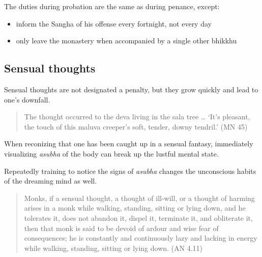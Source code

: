 The duties during probation are the same as during penance, except:

\begin{itemize}
\tightlist
\item
  inform the Sangha of his offense every fortnight, not every day
\item
  only leave the monastery when accompanied by a single other bhikkhu
\end{itemize}

\subsection{Sensual thoughts}

Sensual thoughts are not designated a penalty, but they grow quickly and
lead to one's downfall.

\begin{quote}
The thought occurred to the deva living in the sala tree \ldots{} `It's
pleasant, the touch of this maluva creeper's soft, tender, downy
tendril.' (MN 45)
\end{quote}

When reconizing that one has been caught up in a sensual fantasy,
immediately visualizing \emph{asubha} of the body can break up the
lustful mental state.

Repeatedly training to notice the signs of \emph{asubha} changes the
unconscious habits of the dreaming mind as well.

\begin{quote}
Monks, if a sensual thought, a thought of ill-will, or a thought of
harming arises in a monk while walking, standing, sitting or lying down,
and he tolerates it, does not abandon it, dispel it, terminate it, and
obliterate it, then that monk is said to be devoid of ardour and wise
fear of consequences; he is constantly and continuously lazy and lacking
in energy while walking, standing, sitting or lying down. (AN 4.11)
\end{quote}

